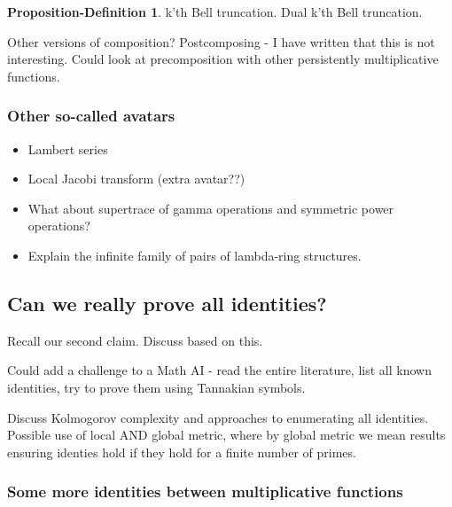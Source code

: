 \documentclass[a4paper]{article}
\theoremstyle{definition}
\newtheorem{propdef}[theorem]{Proposition-Definition}
\theoremstyle{remark}
\begin{document}
\begin{propdef}
k'th Bell truncation. Dual k'th Bell truncation.
\end{propdef}


Other versions of composition? Postcomposing - I have written that this is not interesting. Could look at precomposition with other persistently multiplicative functions.

\subsubsection{Other so-called avatars}

\begin{itemize}

\item Lambert series
\item Local Jacobi transform (extra avatar??)
\item What about supertrace of gamma operations and symmetric power operations?
\item Explain the infinite family of pairs of lambda-ring structures.
\end{itemize}




\subsection{Can we really prove all identities?}

Recall our second claim. Discuss based on this.

Could add a challenge to a Math AI - read the entire literature, list all known identities, try to prove them using Tannakian symbols.

Discuss Kolmogorov complexity and approaches to enumerating all identities. Possible use of local AND global metric, where by global metric we mean results ensuring identies hold if they hold for a finite number of primes.

\subsubsection{Some more identities between multiplicative functions}
\end{document}
